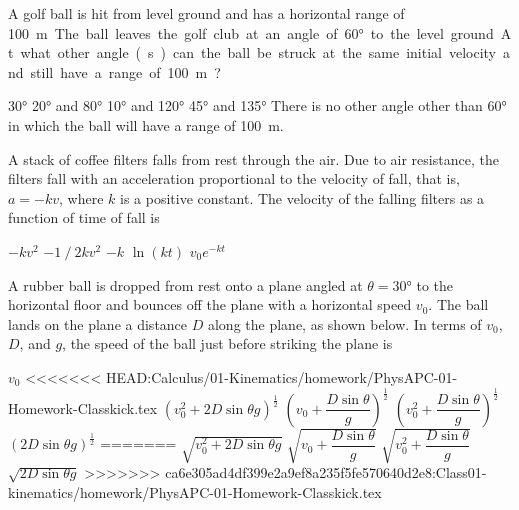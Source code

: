 \documentclass{../../oss-classkick-exam}
\begin{document}
\begin{multicols*}{2}
\begin{questions}
    \question A golf ball is hit from level ground and has a horizontal range of
    \SI{100}\metre. The ball leaves the golf club at an angle of \ang{60} to
    the level ground. At what other angle(s) can the ball be struck at the same
    initial velocity and still have a range of \SI{100}\metre?
    \begin{choices}
      \choice\ang{30}
      \choice\ang{20} and \ang{80}
      \choice\ang{10} and \ang{120}
      \choice\ang{45} and \ang{135}
      \choice There is no other angle other than \ang{60} in which the ball will
      have a range of \SI{100}\metre.
    \end{choices}
    \vspace{.7in}

    \question A stack of coffee filters falls from rest through the air. Due to
    air resistance, the filters fall with an acceleration proportional to the
    velocity of fall, that is, $a=-kv$, where $k$ is a positive constant. The
    velocity of the falling filters as a function of time of fall is
    \begin{choices}
      \choice $-kv^2$
      \choice $-1⁄2kv^2$
      \choice $-k$
      \choice $\ln(kt)$
      \choice $v_0e^{-kt}$
    \end{choices}
    \columnbreak
    
    \question A rubber ball is dropped from rest onto a plane angled at
    $\theta=\ang{30}$ to the horizontal floor and bounces off the plane with a
    horizontal speed $v_0$. The ball lands on the plane a distance $D$ along the
    plane, as shown below. In terms of $v_0$, $D$, and $g$, the speed of the
    ball just before striking the plane is
    \begin{choices}
      \choice $v_0$
<<<<<<< HEAD:Calculus/01-Kinematics/homework/PhysAPC-01-Homework-Classkick.tex
      \choice $\displaystyle\left(v_0^2+2D\sin\theta g\right)^{\frac12}$
      \choice $\left(v_0+\dfrac{D\sin\theta}{g}\right)^{\frac12}$
      \choice $\left(v_0^2+\dfrac{D\sin\theta}{g}\right)^{\frac12}$
      \choice $\displaystyle\left(2D\sin\theta g\right)^{\frac12}$
=======
      \choice $\sqrt{v_0^2+2D\sin\theta g}$
      \choice $\sqrt{v_0+\dfrac{D\sin\theta}g}$
      \choice $\sqrt{v_0^2+\dfrac{D\sin\theta}g}$
      \choice $\sqrt{2D\sin\theta g}$
>>>>>>> ca6e305ad4df399e2a9ef8a235f5fe570640d2e8:Class01-kinematics/homework/PhysAPC-01-Homework-Classkick.tex
    \end{choices}
    \vspace{.7in}
  

\end{questions}
\end{multicols*}
\end{document}
